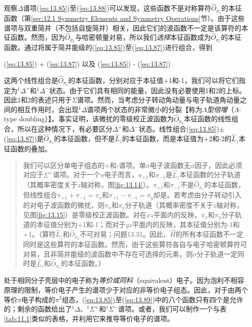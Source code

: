     观察$\Delta$谱项(\ref{eq:13.85})至(\ref{eq:13.88})可以发现，这些函数不是对称算符$\hat{O}_{\sigma_v}$的本征函数（第\ref{sec:12.1 Symmetry Elements and Symmetry Operations}节）。由于这些谱项与双重简并（不包括自旋简并）相关，因此它们的波函数不一定是该算符的本征函数。然而，因为$\hat{O}_{\sigma_v}$与哈密顿量对易，所以我们\textit{选择}本征函数成为$\hat{O}_{\sigma_v}$的本征函数。通过将属于简并能级的(\ref{eq:13.85})至(\ref{eq:13.87})进行组合，得到
    \begin{center}
        (\ref{eq:13.85}) + (\ref{eq:13.87}) 以及 (\ref{eq:13.85}) - (\ref{eq:13.87})
    \end{center}
    这两个线性组合是$\hat{O}_{\sigma_v}$的本征函数，分别对应于本征值+1和-1，我们可以将它们指定为$^1\Delta^+$和$^1\Delta^-$状态。由于它们具有相同的能量，因此没有必要使用1和2的上标。因此1和2的表述只用于$\Sigma$谱项。然而，当考虑分子转动角动量与电子轨道角动量之间的相互作用时，会出现$^1\Delta$谱项两个状态的非常微小的分裂【称为\textit{$\Lambda$型倍增}（$\Lambda$-type doubling）】。事实证明，该微扰的零级校正波函数为$\hat{O}_{\sigma_v}$本征函数的线性组合，所以在这种情况下，有必要区分$\Delta^+$和$\Delta^-$状态。线性组合(\ref{eq:13.85})$\pm$(\ref{eq:13.87})是$\hat{O}_{\sigma_v}$的本征函数，但不是$\hat{L}_z$的本征函数，而是本征值为+2和-2的$\hat{L}_z$本征函数的叠加。
    \begin{quote}
        \small
        \noindent
        我们可以区分单电子组态的+和-谱项。单$\sigma$电子波函数无$\phi$因子，因此必须对应于$\Sigma^+$谱项。对于一个$\pi$电子而言，$\pi_{+1}$和$\pi_{-1}$是$\hat{L}_z$本征函数的分子轨道（其概率密度关于$z$轴对称，图\ref{fig:13.14}）。$\pi_{+1}$和$\pi_{-1}$不是$\hat{O}_{\sigma_v}$的本征函数，但线性组合$\pi_{+1} + \pi_{-1} = \pi_x$和$\pi_{+1} - \pi_{-1} = \pi_y$却是。若考虑由分子转动引入的对电子波函数的微扰，则$\pi_x$和$\pi_y$分子轨道（其概率密度不关于$z$轴对称，见图\ref{fig:13.15}）是零级校正波函数。对在$xz$平面内的反映，$\pi_x$和$\pi_y$分子轨道的本征值分别为+1和-1；而对于$yz$平面内的反映，其本征值分别为-1和+1。（算符$\hat{L}_z$和$\hat{O}_{\sigma_v}$不可对易；问题13.31。因此，$\hat{H}$的所有本征函数不一定同时是这些算符的本征函数。然而，由于这些算符各自与电子哈密顿算符可对易，且非简并能级的波函数中不存在可选择的元素，则$\sigma$分子轨道一定同时是$\hat{L}_z$和$\hat{O}_{\sigma_v}$的本征函数。）
    \end{quote}

    处于相同分子壳层中的电子称为\textit{等价或同科}（equivalent）电子。因为泡利不相容原理的限制，等价电子产生的谱项少于对应的非等价电子组态。因此，对于由两个等价$\pi$电子构成的$\pi^2$组态，(\ref{eq:13.85})至(\ref{eq:13.89})中的八个函数只有四个是允许的；剩余的函数给出了$^1\Delta$、$^1\Sigma^+$和$^1\Sigma^-$谱项。或者，我们可以制作一个与表\ref{tab:11.1}类似的表格，并利用它来推导等价电子的谱项。


